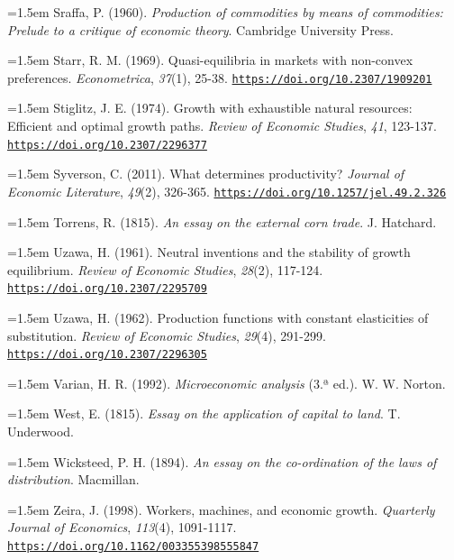 \documentclass[10pt,a4paper]{article}
\begin{document}
\noindent\hangindent=1.5em Sraffa, P. (1960). \textit{Production of commodities by means of commodities: Prelude to a critique of economic theory}. Cambridge University Press.

\noindent\hangindent=1.5em Starr, R. M. (1969). Quasi-equilibria in markets with non-convex preferences. \textit{Econometrica}, \textit{37}(1), 25-38. \href{https://doi.org/10.2307/1909201}{\nolinkurl{https://doi.org/10.2307/1909201}}

\noindent\hangindent=1.5em Stiglitz, J. E. (1974). Growth with exhaustible natural resources: Efficient and optimal growth paths. \textit{Review of Economic Studies}, \textit{41}, 123-137. \href{https://doi.org/10.2307/2296377}{\nolinkurl{https://doi.org/10.2307/2296377}}

\noindent\hangindent=1.5em Syverson, C. (2011). What determines productivity? \textit{Journal of Economic Literature}, \textit{49}(2), 326-365. \href{https://doi.org/10.1257/jel.49.2.326}{\nolinkurl{https://doi.org/10.1257/jel.49.2.326}}

\noindent\hangindent=1.5em Torrens, R. (1815). \textit{An essay on the external corn trade}. J. Hatchard.

\noindent\hangindent=1.5em Uzawa, H. (1961). Neutral inventions and the stability of growth equilibrium. \textit{Review of Economic Studies}, \textit{28}(2), 117-124. \href{https://doi.org/10.2307/2295709}{\nolinkurl{https://doi.org/10.2307/2295709}}

\noindent\hangindent=1.5em Uzawa, H. (1962). Production functions with constant elasticities of substitution. \textit{Review of Economic Studies}, \textit{29}(4), 291-299. \href{https://doi.org/10.2307/2296305}{\nolinkurl{https://doi.org/10.2307/2296305}}

\noindent\hangindent=1.5em Varian, H. R. (1992). \textit{Microeconomic analysis} (3.ª ed.). W. W. Norton.

\noindent\hangindent=1.5em West, E. (1815). \textit{Essay on the application of capital to land}. T. Underwood.

\noindent\hangindent=1.5em Wicksteed, P. H. (1894). \textit{An essay on the co-ordination of the laws of distribution}. Macmillan.

\noindent\hangindent=1.5em Zeira, J. (1998). Workers, machines, and economic growth. \textit{Quarterly Journal of Economics}, \textit{113}(4), 1091-1117. \href{https://doi.org/10.1162/003355398555847}{\nolinkurl{https://doi.org/10.1162/003355398555847}}
\end{document}
